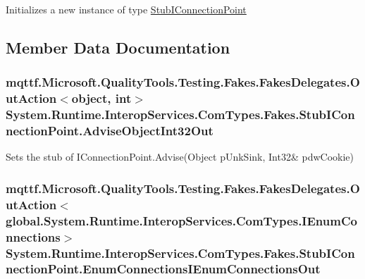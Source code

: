 Initializes a new instance of type \hyperlink{class_system_1_1_runtime_1_1_interop_services_1_1_com_types_1_1_fakes_1_1_stub_i_connection_point}{Stub\-I\-Connection\-Point}



\subsection{Member Data Documentation}
\hypertarget{class_system_1_1_runtime_1_1_interop_services_1_1_com_types_1_1_fakes_1_1_stub_i_connection_point_af830b261b7ebead1feaf45e91e9d4625}{
\subsubsection[{Advise\-Object\-Int32\-Out}]{\setlength{\rightskip}{0pt plus 5cm}mqttf.\-Microsoft.\-Quality\-Tools.\-Testing.\-Fakes.\-Fakes\-Delegates.\-Out\-Action$<$object, int$>$ System.\-Runtime.\-Interop\-Services.\-Com\-Types.\-Fakes.\-Stub\-I\-Connection\-Point.\-Advise\-Object\-Int32\-Out}}\label{class_system_1_1_runtime_1_1_interop_services_1_1_com_types_1_1_fakes_1_1_stub_i_connection_point_af830b261b7ebead1feaf45e91e9d4625}


Sets the stub of I\-Connection\-Point.\-Advise(Object p\-Unk\-Sink, Int32\& pdw\-Cookie)

\hypertarget{class_system_1_1_runtime_1_1_interop_services_1_1_com_types_1_1_fakes_1_1_stub_i_connection_point_ac5994a833920ffbb058f3c53f709d897}{
\subsubsection[{Enum\-Connections\-I\-Enum\-Connections\-Out}]{\setlength{\rightskip}{0pt plus 5cm}mqttf.\-Microsoft.\-Quality\-Tools.\-Testing.\-Fakes.\-Fakes\-Delegates.\-Out\-Action$<$global.\-System.\-Runtime.\-Interop\-Services.\-Com\-Types.\-I\-Enum\-Connections$>$ System.\-Runtime.\-Interop\-Services.\-Com\-Types.\-Fakes.\-Stub\-I\-Connection\-Point.\-Enum\-Connections\-I\-Enum\-Connections\-Out}}\label{class_system_1_1_runtime_1_1_interop_services_1_1_com_types_1_1_fakes_1_1_stub_i_connection_point_ac5994a833920ffbb058f3c53f709d897}


